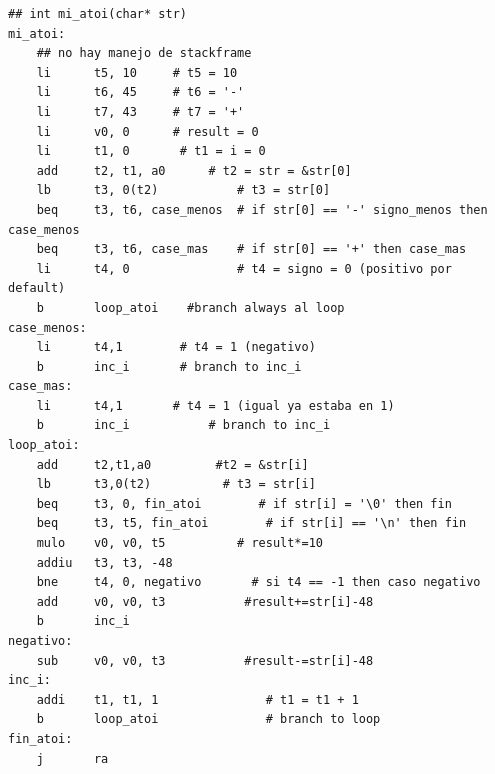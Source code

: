 \documentclass[a4paper,10pt]{article}
\numberwithin{equation}{section}
\numberwithin{figure}{section}
\begin{document}
\begin{lstlisting}
## int mi_atoi(char* str)
mi_atoi:
    ## no hay manejo de stackframe
    li      t5, 10     # t5 = 10
    li      t6, 45     # t6 = '-'
    li      t7, 43     # t7 = '+'
    li      v0, 0      # result = 0
    li		t1, 0		# t1 = i = 0
    add		t2, t1, a0		# t2 = str = &str[0]
    lb		t3, 0(t2)		    # t3 = str[0]
    beq		t3, t6, case_menos 	# if str[0] == '-' signo_menos then case_menos
    beq		t3, t6, case_mas	# if str[0] == '+' then case_mas
    li		t4, 0		        # t4 = signo = 0 (positivo por default)
    b       loop_atoi    #branch always al loop
case_menos:
    li		t4,1 		# t4 = 1 (negativo)
    b       inc_i       # branch to inc_i
case_mas:
    li      t4,1       # t4 = 1 (igual ya estaba en 1)
    b		inc_i			# branch to inc_i  
loop_atoi:
    add     t2,t1,a0         #t2 = &str[i]
    lb      t3,0(t2)          # t3 = str[i]
    beq     t3, 0, fin_atoi        # if str[i] = '\0' then fin
    beq		t3, t5, fin_atoi	    # if str[i] == '\n' then fin
    mulo	v0, v0, t5			# result*=10    
    addiu   t3, t3, -48
    bne     t4, 0, negativo       # si t4 == -1 then caso negativo
    add     v0, v0, t3           #result+=str[i]-48
    b       inc_i
negativo:
    sub     v0, v0, t3           #result-=str[i]-48
inc_i:
    addi	t1, t1, 1			    # t1 = t1 + 1
    b		loop_atoi			    # branch to loop
fin_atoi:
    j       ra
\end{lstlisting}
\end{document}
